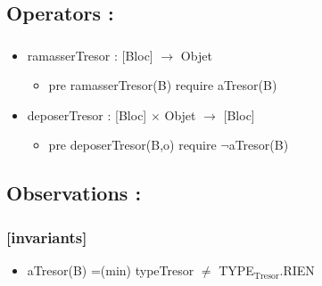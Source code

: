 \documentclass[11pt]{article}
\begin{document}
\subsection{Operators :}
\label{sec-1.6}

\subsubsection{}

\begin{itemize}

\item ramasserTresor : [Bloc] $\to$ Objet\\
\label{sec-1.6.1.1}

\begin{itemize}

\item pre ramasserTresor(B) require aTresor(B)\\
\label{sec-1.6.1.1.1}


\end{itemize} %

\item deposerTresor : [Bloc] $\times$ Objet $\to$ [Bloc]\\
\label{sec-1.6.1.2}

\begin{itemize}

\item pre deposerTresor(B,o) require $\neg$aTresor(B)\\
\label{sec-1.6.1.2.1}



\end{itemize} %
\end{itemize} %
\subsection{Observations :}
\label{sec-1.7}

\subsubsection{[invariants]}
\label{sec-1.7.1}

\begin{itemize}

\item aTresor(B) =(min) typeTresor $\neq$ TYPE$_{\mathrm{Tresor}}$.RIEN\\
\label{sec-1.7.1.1}


\end{itemize} %
\end{document}
